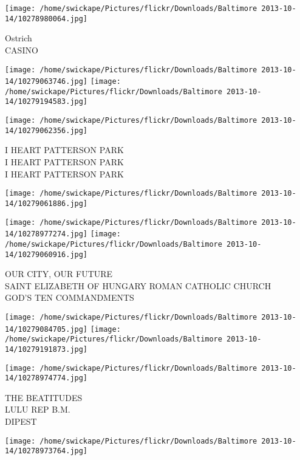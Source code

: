 \documentclass[10pt,letterpaper]{article}
\begin{document}
\vspace{0.25in}
\texttt{[image: /home/swickape/Pictures/flickr/Downloads/Baltimore 2013-10-14/10278980064.jpg]}

Ostrich\\
CASINO\\
\pagebreak

\texttt{[image: /home/swickape/Pictures/flickr/Downloads/Baltimore 2013-10-14/10279063746.jpg]}
\texttt{[image: /home/swickape/Pictures/flickr/Downloads/Baltimore 2013-10-14/10279194583.jpg]}

\texttt{[image: /home/swickape/Pictures/flickr/Downloads/Baltimore 2013-10-14/10279062356.jpg]}

I HEART PATTERSON PARK\\
I HEART PATTERSON PARK\\
I HEART PATTERSON PARK\\
\pagebreak

\texttt{[image: /home/swickape/Pictures/flickr/Downloads/Baltimore 2013-10-14/10279061886.jpg]}

\vspace{0.25in}
\texttt{[image: /home/swickape/Pictures/flickr/Downloads/Baltimore 2013-10-14/10278977274.jpg]}
\texttt{[image: /home/swickape/Pictures/flickr/Downloads/Baltimore 2013-10-14/10279060916.jpg]}

OUR CITY, OUR FUTURE\\
SAINT ELIZABETH OF HUNGARY ROMAN CATHOLIC CHURCH\\
GOD'S TEN COMMANDMENTS\\
\pagebreak

\texttt{[image: /home/swickape/Pictures/flickr/Downloads/Baltimore 2013-10-14/10279084705.jpg]}
\texttt{[image: /home/swickape/Pictures/flickr/Downloads/Baltimore 2013-10-14/10279191873.jpg]}

\vspace{0.25in}
\texttt{[image: /home/swickape/Pictures/flickr/Downloads/Baltimore 2013-10-14/10278974774.jpg]}

THE BEATITUDES\\
LULU REP B.M.\\
DIPEST\\
\pagebreak

\texttt{[image: /home/swickape/Pictures/flickr/Downloads/Baltimore 2013-10-14/10278973764.jpg]}
\end{document}

